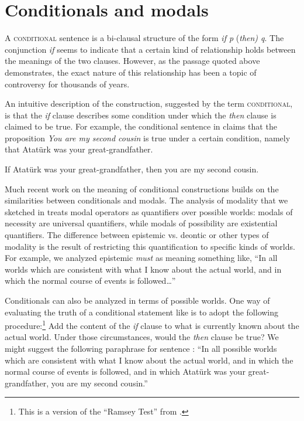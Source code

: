 \section{Conditionals and modals}\label{sec:} %

A \textsc{conditional} sentence is a bi-clausal structure of the form \textit{if p} (\textit{then) q}. The conjunction \textit{if} seems to indicate that a certain kind of relationship holds between the meanings of the two clauses. However, as the passage quoted above demonstrates, the exact nature of this relationship has been a topic of controversy for thousands of years.



An intuitive description of the construction, suggested by the term \textsc{conditional}, is that the \textit{if} clause describes some condition under which the \textit{then} clause is claimed to be true. For example, the conditional sentence in  claims that the proposition \textit{You are my second cousin} is true under a certain condition, namely that Atatürk was your great-grandfather.


\ea
If Atatürk was your great-grandfather, then you are my second cousin.
\z


Much recent work on the meaning of conditional constructions builds on the similarities between conditionals and modals. The analysis of modality that we sketched in  treats modal operators as quantifiers over possible worlds: modals of necessity are universal quantifiers, while modals of possibility are existential quantifiers. The difference between epistemic vs. deontic or other types of modality is the result of restricting this quantification to specific kinds of worlds. For example, we analyzed epistemic \textit{must} as meaning something like, “In all worlds which are consistent with what I know about the actual world, and in which the normal course of events is followed…”



Conditionals can also be analyzed in terms of possible worlds. One way of evaluating the truth of a conditional statement like  is to adopt the following procedure:\footnote{This is a version of the “Ramsey Test” from \citet{Stalnaker1968}.} Add the content of the \textit{if} clause to what is currently known about the actual world. Under those circumstances, would the \textit{then} clause be true? We might suggest the following paraphrase for sentence : “In all possible worlds which are consistent with what I know about the actual world, and in which the normal course of events is followed, and in which Atatürk was your great-grandfather, you are my second cousin.”



